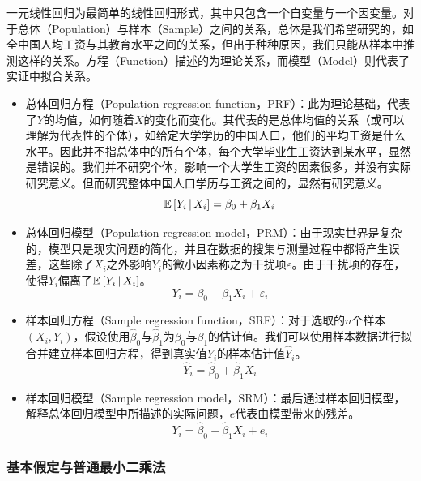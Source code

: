 \documentclass[11pt]{article}
\begin{document}
一元线性回归为最简单的线性回归形式，其中只包含一个自变量与一个因变量。对于总体（Population）与样本（Sample）之间的关系，总体是我们希望研究的，如全中国人均工资与其教育水平之间的关系，但出于种种原因，我们只能从样本中推测这样的关系。方程（Function）描述的为理论关系，而模型（Model）则代表了实证中拟合关系。
\begin{itemize}
    \item 总体回归方程（Population regression function，PRF）：此为理论基础，代表了$Y$的均值，如何随着$X$的变化而变化。其代表的是总体均值的关系（或可以理解为代表性的个体），如给定大学学历的中国人口，他们的平均工资是什么水平。因此并不指总体中的所有个体，每个大学毕业生工资达到某水平，显然是错误的。我们并不研究个体，影响一个大学生工资的因素很多，并没有实际研究意义。但而研究整体中国人口学历与工资之间的，显然有研究意义。
    \begin{equation*}
        \mathbb{E}\left[ Y_i \,\vert\, X_i \right] = \beta_0 + \beta_1 X_i
    \end{equation*}
    \item 总体回归模型（Population regression model，PRM）：由于现实世界是复杂的，模型只是现实问题的简化，并且在数据的搜集与测量过程中都将产生误差，这些除了$X_i$之外影响$Y_i$的微小因素称之为干扰项$\varepsilon$。由于干扰项的存在，使得$Y_i$偏离了$\mathbb{E}\left[ Y_i \,\vert\, X_i \right]$。
    \begin{equation*}
        Y_i = \beta_0 + \beta_1 X_i + \varepsilon_i
    \end{equation*}
    \item 样本回归方程（Sample regression function，SRF）：对于选取的$n$个样本$(X_i,Y_i)$，假设使用$\hat{\beta}_0$与$\hat{\beta}_1$为$\beta_0$与$\beta_1$的估计值。我们可以使用样本数据进行拟合并建立样本回归方程，得到真实值$Y_i$的样本估计值$\hat{Y}_i$。
    \begin{equation*}
        \hat{Y}_i = \hat{\beta}_0 + \hat{\beta}_1 X_i
    \end{equation*}
    \item 样本回归模型（Sample regression model，SRM）：最后通过样本回归模型，解释总体回归模型中所描述的实际问题，$e$代表由模型带来的残差。
    \begin{equation*}
        Y_i = \hat{\beta}_0 + \hat{\beta}_1 X_i + e_i
    \end{equation*}
\end{itemize}

\subsubsection{基本假定与普通最小二乘法}
\end{document}
